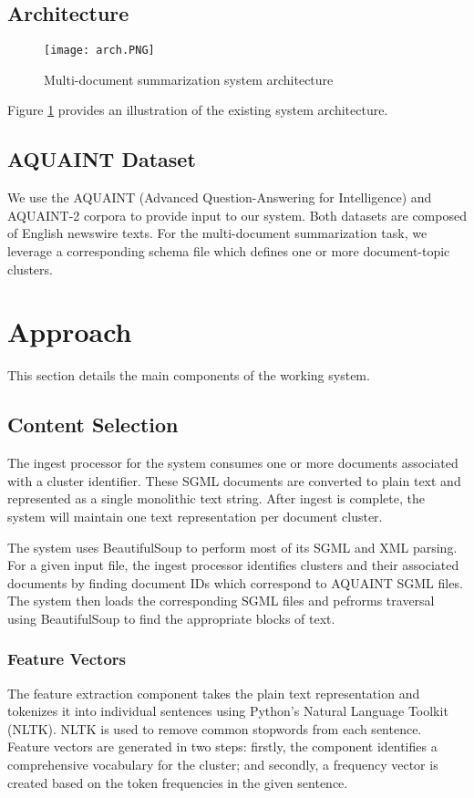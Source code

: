 \documentclass[11pt]{article}
\begin{document}
	\subsection{Architecture}
	\begin{figure}
		\texttt{[image: arch.PNG]}
		\caption{Multi-document summarization system architecture}
		\label{fig:arch}
	\end{figure}
	
	Figure \ref{fig:arch} provides an illustration of the existing system architecture.
	
	\subsection{AQUAINT Dataset}
	We use the AQUAINT (Advanced Question-Answering for Intelligence) and AQUAINT-2 corpora to provide input to our system. Both datasets are composed of English newswire texts. For the multi-document summarization task, we leverage a corresponding schema file which defines one or more document-topic clusters. 
	
	\section{Approach}
	
	This section details the main components of the working system.
	
	\subsection{Content Selection}
	The ingest processor for the system consumes one or more documents associated with a cluster identifier. These SGML documents are converted to plain text and represented as a single monolithic text string. After ingest is complete, the system will maintain one text representation per document cluster.
	
	The system uses BeautifulSoup to perform most of its SGML and XML parsing. For a given input file, the ingest processor identifies clusters and their associated documents by finding document IDs which correspond to AQUAINT SGML files. The system then loads the corresponding SGML files and pefrorms traversal using BeautifulSoup to find the appropriate blocks of text.
	\subsubsection{Feature Vectors}
	The feature extraction component takes the plain text representation and tokenizes it into individual sentences using Python's Natural Language Toolkit (NLTK). NLTK is used to remove common stopwords from each sentence. Feature vectors are generated in two steps: firstly, the component identifies a comprehensive vocabulary for the cluster; and secondly, a frequency vector is created based on the token frequencies in the given sentence. 
	
\end{document}
